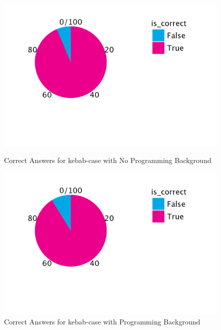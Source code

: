 \documentclass[unicode,11pt,a4paper,oneside,numbers=endperiod,openany]{scrartcl}
\begin{document}
\begin{figure}[h!]
    \begin{minipage}{0.45\textwidth}
        \centering
        \includegraphics[width=\textwidth]{./figures/correct_kebab_noBack.png}
        \caption{Correct Answers for kebab-case with No Programming Background}
        \label{fig:correct_kebab_noback}
    \end{minipage}
    \hfill
    \begin{minipage}{0.45\textwidth}
        \centering
        \includegraphics[width=\textwidth]{./figures/correct_keb_backgr.png}
        \caption{Correct Answers for kebab-case with Programming Background}
        \label{fig:correct_kebab_background}
    \end{minipage}
\end{figure}
\end{document}
